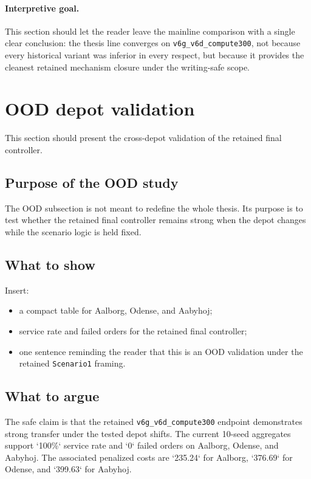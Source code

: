 \paragraph{Interpretive goal.}
This section should let the reader leave the mainline comparison with a single clear conclusion:
the thesis line converges on \texttt{v6g\_v6d\_compute300}, not because every historical variant was inferior in every respect, but because it provides the cleanest retained mechanism closure under the writing-safe scope.

\section{OOD depot validation}
\label{sec:results-ood}

This section should present the cross-depot validation of the retained final controller.

\subsection{Purpose of the OOD study}
\label{sec:results-ood-purpose}

The OOD subsection is not meant to redefine the whole thesis.
Its purpose is to test whether the retained final controller remains strong when the depot changes while the scenario logic is held fixed.

\subsection{What to show}
\label{sec:results-ood-evidence}

Insert:
\begin{itemize}
    \item a compact table for Aalborg, Odense, and Aabyhoj;
    \item service rate and failed orders for the retained final controller;
    \item one sentence reminding the reader that this is an OOD validation under the retained \texttt{Scenario1} framing.
\end{itemize}

\subsection{What to argue}
\label{sec:results-ood-argument}

The safe claim is that the retained \texttt{v6g\_v6d\_compute300} endpoint demonstrates strong transfer under the tested depot shifts.
The current 10-seed aggregates support `100\%` service rate and `0` failed orders on Aalborg, Odense, and Aabyhoj.
The associated penalized costs are `235.24` for Aalborg, `376.69` for Odense, and `399.63` for Aabyhoj.


